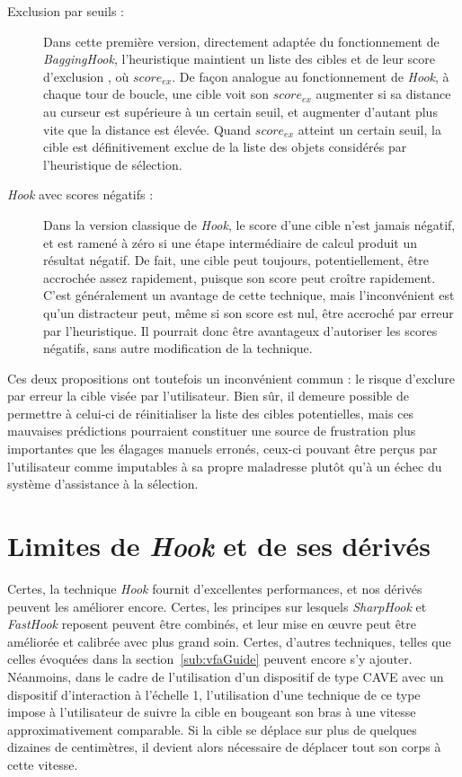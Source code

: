 	\begin{description}
		\item[Exclusion par seuils :] Dans cette première version, directement adaptée du fonctionnement de \emph{BaggingHook}, l'heuristique maintient un liste des cibles et de leur \og score d'exclusion \fg{}, où $score_{ex}$. De façon analogue au fonctionnement de \emph{Hook}, à chaque tour de boucle, une cible voit son $score_{ex}$ augmenter si sa distance au curseur est supérieure à un certain seuil, et augmenter d'autant plus vite que la distance est élevée. Quand $score_{ex}$ atteint un certain seuil, la cible est définitivement exclue de la liste des objets considérés par l'heuristique de sélection.
		\item[\emph{Hook} avec scores négatifs :] Dans la version classique de \emph{Hook}, le score d'une cible n'est jamais négatif, et est ramené à zéro si une étape intermédiaire de calcul produit un résultat négatif. De fait, une cible peut toujours, potentiellement, être accrochée assez rapidement, puisque son score peut croître rapidement. C'est généralement un avantage de cette technique, mais l'inconvénient est qu'un distracteur peut, même si son score est nul, être accroché par erreur par l'heuristique. Il pourrait donc être avantageux d'autoriser les scores négatifs, sans autre modification de la technique.
	\end{description}
	
	Ces deux propositions ont toutefois un inconvénient commun : le risque d'exclure par erreur la cible visée par l'utilisateur. Bien sûr, il demeure possible de permettre à celui-ci de réinitialiser la liste des cibles potentielles, mais ces mauvaises prédictions pourraient constituer une source de frustration plus importantes que les élagages manuels erronés, ceux-ci pouvant être perçus par l'utilisateur comme imputables à sa propre maladresse plutôt qu'à un échec du système d'assistance à la sélection.
	
		
	\section{Limites de \emph{Hook} et de ses dérivés}
	Certes, la technique \emph{Hook} fournit d'excellentes performances, et nos dérivés peuvent les améliorer encore. Certes, les principes sur lesquels \emph{SharpHook} et \emph{FastHook} reposent peuvent être combinés, et leur mise en œuvre peut être améliorée et calibrée avec plus grand soin. Certes, d'autres techniques, telles que celles évoquées dans la section~\ref{sub:vfaGuide} peuvent encore s'y ajouter. Néanmoins, dans le cadre de l'utilisation d'un dispositif de type CAVE avec un dispositif d'interaction à l'échelle 1, l'utilisation d'une technique de ce type impose à l'utilisateur de suivre la cible en bougeant son bras à une vitesse approximativement comparable. Si la cible se déplace sur plus de quelques dizaines de centimètres, il devient alors nécessaire de déplacer tout son corps à cette vitesse.
	

